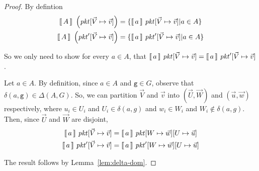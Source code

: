 \begin{proof}
  By defintion
  \begin{align*}
    \llbracket\,A\,\rrbracket~\left(\mathit{pkt}[\vec V \mapsto \vec v]\right) &= \{\llbracket\,a\,\rrbracket~\mathit{pkt}[\vec V \mapsto \vec v] | a \in A\} \\
    \llbracket\,A\,\rrbracket~\left(\mathit{pkt}'[\vec V \mapsto \vec v]\right) &= \{\llbracket\,a\,\rrbracket~\mathit{pkt}'[\vec V \mapsto \vec v] | a \in A\} \\
  \end{align*}

  So we only need to show for every $a \in A$, that
  $\llbracket\,a\,\rrbracket~\mathit{pkt}[\vec V \mapsto \vec v] = \llbracket\,a\,\rrbracket~\mathit{pkt}'[\vec V
  \mapsto \vec v] $.

  Let $a \in A$. By definition, since $a \in A$ and
  $\texttt{g} \in G$, observe that
  $\delta(a,\texttt{g}) \in \Delta(A,G)$. So, we can partition
  $\vec V$ and $\vec v$ into $(\vec{U}, \vec W)$ and
  $(\vec u, \vec w)$ respectively, where $u_i \in U_i$ and
  $U_i \in \delta(a,g)$ and $w_i \in W_i$ and $W_i \not\in
  \delta(a,g)$. Then, since $\vec{U}$ and $\vec W$ are disjoint,
  \begin{align*}
    \llbracket\,a\,\rrbracket~\mathit{pkt}[\vec V \mapsto \vec v] &= \llbracket\,a\,\rrbracket~\mathit{pkt}[W\mapsto\vec{w}][U \mapsto\vec{u}]\\
    \llbracket\,a\,\rrbracket~\mathit{pkt}'[\vec V \mapsto \vec v] &= \llbracket\,a\,\rrbracket~\mathit{pkt}'[W\mapsto\vec{w}][U \mapsto\vec{u}]
  \end{align*}

  The result follows by Lemma~\ref{lem:delta-dom}.
  
\end{proof}


